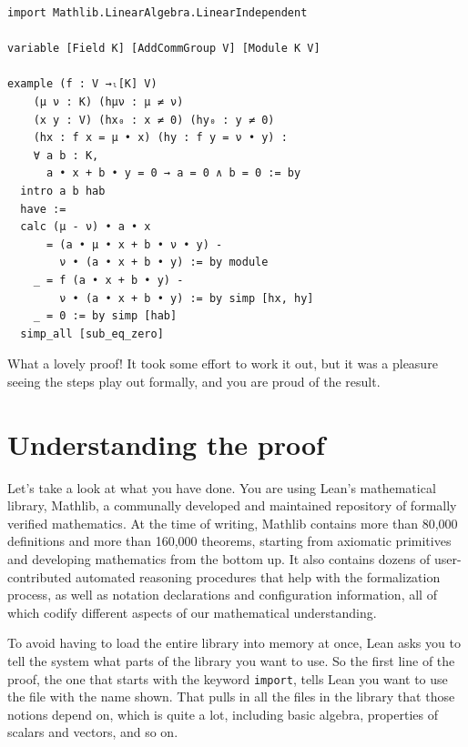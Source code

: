 \documentclass[11pt]{article}
\begin{document}
\begin{lstlisting}[numbers=right]
import Mathlib.LinearAlgebra.LinearIndependent

variable [Field K] [AddCommGroup V] [Module K V]

example (f : V →ₗ[K] V)
    (μ ν : K) (hμν : μ ≠ ν)
    (x y : V) (hx₀ : x ≠ 0) (hy₀ : y ≠ 0)
    (hx : f x = μ • x) (hy : f y = ν • y) :
    ∀ a b : K,
      a • x + b • y = 0 → a = 0 ∧ b = 0 := by
  intro a b hab
  have :=
  calc (μ - ν) • a • x
      = (a • μ • x + b • ν • y) -
        ν • (a • x + b • y) := by module
    _ = f (a • x + b • y) -
        ν • (a • x + b • y) := by simp [hx, hy]
    _ = 0 := by simp [hab]
  simp_all [sub_eq_zero]
\end{lstlisting}
What a lovely proof! It took some effort to work it out, but it was a pleasure seeing the steps play out formally, and you are proud of the result.

\section*{Understanding the proof}

Let's take a look at what you have done. You are using Lean's mathematical library, Mathlib, a communally developed and maintained repository of formally verified mathematics.
At the time of writing, Mathlib contains more than 80,000 definitions and more than 160,000 theorems, starting from axiomatic primitives and developing mathematics from the bottom up.
It also contains dozens of user-contributed automated reasoning procedures that help with the formalization process, as well as notation declarations and configuration information, all of which codify different aspects of our mathematical understanding.

To avoid having to load the entire library into memory at once, Lean asks you to tell the system what parts of the library you want to use.
So the first line of the proof, the one that starts with the keyword \lstinline{import}, tells Lean you want to use the file with the name shown.
That pulls in all the files in the library that those notions depend on, which is quite a lot, including basic algebra, properties of scalars and vectors, and so on.
\end{document}
